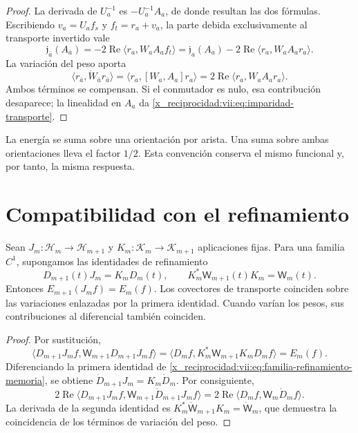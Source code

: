 \begin{proof}
La derivada de \(U_a^{-1}\) es \(-U_a^{-1}A_a\), de donde resultan
las dos fórmulas. Escribiendo \(v_a=U_af_s\) y \(f_t=r_a+v_a\),
la parte debida exclusivamente al transporte invertido vale
\[
 \mathfrak j_{\bar a}(A_{\bar a})
 =-2\operatorname{Re}\langle r_a,W_aA_af_t\rangle
 =\mathfrak j_a(A_a)
   -2\operatorname{Re}\langle r_a,W_aA_ar_a\rangle.
\]
La variación del peso aporta
\[
 \langle r_{\bar a},\dot W_{\bar a}r_{\bar a}\rangle
 =\langle r_a,[W_a,A_a]r_a\rangle
 =2\operatorname{Re}\langle r_a,W_aA_ar_a\rangle.
\]
Ambos términos se compensan. Si el conmutador es nulo, esa contribución
desaparece; la linealidad en \(A_a\) da
\eqref{x_reciprocidad:vii:eq:imparidad-transporte}.
\end{proof}

La energía se suma sobre una orientación por arista. Una suma sobre ambas
orientaciones lleva el factor \(1/2\). Esta convención conserva el mismo
funcional y, por tanto, la misma respuesta.

\section{Compatibilidad con el refinamiento}
\label{x_reciprocidad:vii:subsec:refinamiento-respuesta}

\begin{theorem}
\label{x_reciprocidad:vii:thm:refinamiento-respuesta}
Sean \(J_m:\mathcal H_m\to\mathcal H_{m+1}\) y
\(K_m:\mathcal K_m\to\mathcal K_{m+1}\) aplicaciones fijas.
Para una familia \(C^1\), supongamos las identidades de refinamiento
\begin{equation}
 D_{m+1}(t)J_m=K_mD_m(t),\qquad
 K_m^*\mathsf W_{m+1}(t)K_m=\mathsf W_m(t).
 \label{x_reciprocidad:vii:eq:familia-refinamiento-memoria}
\end{equation}
Entonces \(E_{m+1}(J_mf)=E_m(f)\).
Los covectores de transporte coinciden sobre las variaciones enlazadas
por la primera identidad. Cuando varían los pesos, sus contribuciones
al diferencial también coinciden.
\end{theorem}

\begin{proof}
Por sustitución,
\[
 \langle D_{m+1}J_mf,\mathsf W_{m+1}D_{m+1}J_mf\rangle
 =\langle D_mf,K_m^*\mathsf W_{m+1}K_mD_mf\rangle=E_m(f).
\]
Diferenciando la primera identidad de
\eqref{x_reciprocidad:vii:eq:familia-refinamiento-memoria}, se obtiene
\(\dot D_{m+1}J_m=K_m\dot D_m\). Por consiguiente,
\[
 2\operatorname{Re}
 \langle D_{m+1}J_mf,\mathsf W_{m+1}\dot D_{m+1}J_mf\rangle
 =2\operatorname{Re}\langle D_mf,\mathsf W_m\dot D_mf\rangle.
\]
La derivada de la segunda identidad es
\(K_m^*\dot{\mathsf W}_{m+1}K_m=\dot{\mathsf W}_m\), que demuestra
la coincidencia de los términos de variación del peso.
\end{proof}

